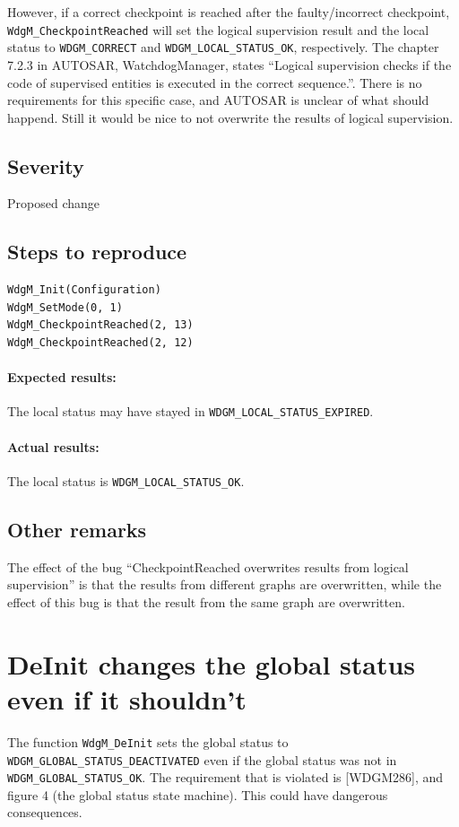 However, if a correct checkpoint is reached after the faulty/incorrect
checkpoint, \lstinline!WdgM_CheckpointReached! will set the logical supervision
result and the local status to \lstinline!WDGM_CORRECT! and \lstinline!WDGM_LOCAL_STATUS_OK!,
respectively.  The chapter 7.2.3 in AUTOSAR, WatchdogManager, states
``Logical supervision checks if the code of supervised entities is
executed in the correct sequence.''.  There is no requirements for this
specific case, and AUTOSAR is unclear of what should happend. Still it
would be nice to not overwrite the results of logical supervision.

\subsection{Severity}
Proposed change

\subsection{Steps to reproduce}
\begin{lstlisting}
WdgM_Init(Configuration)
WdgM_SetMode(0, 1)
WdgM_CheckpointReached(2, 13)
WdgM_CheckpointReached(2, 12)
\end{lstlisting}
\paragraph{Expected results:}
The local status may have stayed in \lstinline!WDGM_LOCAL_STATUS_EXPIRED!.
\paragraph{Actual results:}
The local status is \lstinline!WDGM_LOCAL_STATUS_OK!.

\subsection{Other remarks}
The effect of the bug ``CheckpointReached overwrites results from
logical supervision'' is that the results from different graphs are
overwritten, while the effect of this bug is that the result from the
same graph are overwritten.


\section{DeInit changes the global status even if it shouldn't}
The function \lstinline!WdgM_DeInit! sets the global status to
\lstinline!WDGM_GLOBAL_STATUS_DEACTIVATED! even if the global status was not in
\lstinline!WDGM_GLOBAL_STATUS_OK!. The requirement that is violated is [WDGM286],
and figure 4 (the global status state machine). This could have
dangerous consequences.

